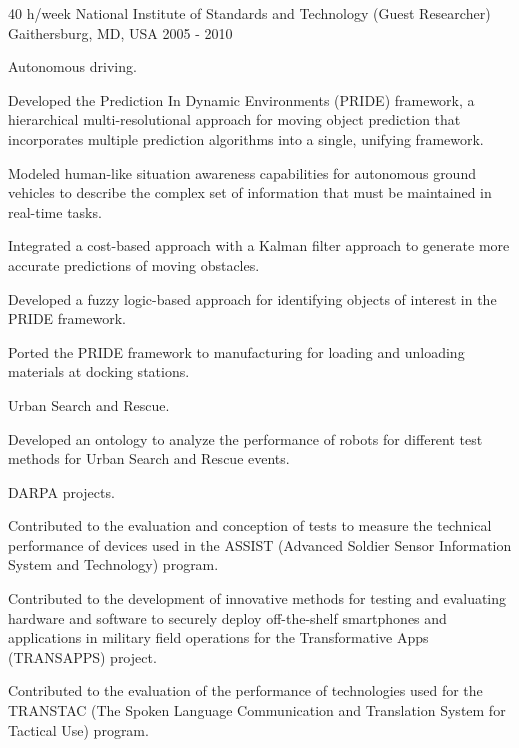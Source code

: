 \begin{cventries}
\cventry
{40 h/week} %
{National Institute of Standards and Technology (Guest Researcher)} %
{Gaithersburg, MD, USA} %
{2005 - 2010} %
{ %
\begin{cvitems}
\item {Autonomous driving.}
    \begin{cvitems2}
    \item {Developed the Prediction In Dynamic Environments (PRIDE) framework, a hierarchical multi-resolutional approach for moving object prediction that incorporates multiple prediction algorithms into a single, unifying framework.} 
    \item {Modeled human-like situation awareness capabilities for autonomous ground vehicles to describe the complex set of information that must be maintained in real-time tasks.}
    \item {Integrated a cost-based approach with a Kalman filter approach to generate more accurate predictions of moving obstacles.}
    \item {Developed a fuzzy logic-based approach for identifying objects of interest in the PRIDE framework.}
    \item {Ported the PRIDE framework to manufacturing for loading and unloading materials at docking stations.}
    \end{cvitems2}
    \vspace{10pt}
\item {Urban Search and Rescue.}
    \begin{cvitems2}
    \item {Developed an ontology to analyze the performance of robots for different test methods for Urban Search and Rescue  events.}
    \end{cvitems2}
    \vspace{10pt}
\item {DARPA projects.}
    \begin{cvitems2}
    \item {Contributed to the evaluation and conception of tests to measure the technical performance of devices used in the ASSIST (Advanced Soldier Sensor Information System and Technology) program.}
    \item {Contributed to the development of innovative methods for testing and evaluating hardware and software to securely deploy off-the-shelf smartphones and applications in military field operations for the Transformative Apps (TRANSAPPS) project.}
    \item {Contributed to the evaluation of the performance of technologies used for the TRANSTAC (The Spoken Language Communication and Translation System for Tactical Use) program.}

\end{cvitems2}
\end{cvitems}}
\end{cventries}
